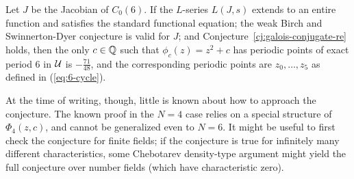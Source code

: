 \begin{corollary}
  \label{cor:6-cycle}
  Let $J$ be the Jacobian of $C_0(6)$. If the $L$-series $L(J, s)$
  extends to an entire function and satisfies the standard functional
  equation; the weak Birch and Swinnerton-Dyer conjecture is valid for
  $J$; and Conjecture~\ref{cj:galois-conjugate-re} holds, then the only
  $c \in \mathbb{Q}$ such that $\phi_c(z) = z^2 + c$ has periodic points of
  exact period 6 in $\mathcal{U}$ is $-\frac{71}{48}$, and the corresponding
  periodic points are $z_0, \dots, z_5$ as defined in
  (\ref{eq:6-cycle}).
\end{corollary}

At the time of writing, though, little is known about how to approach
the conjecture. The known proof in the $N = 4$ case relies on a
special structure of $\Phi_4(z, c)$, and cannot be generalized even to
$N = 6$. It might be useful to first check the conjecture for finite
fields; if the conjecture is true for infinitely many different
characteristics, some Chebotarev density-type argument might yield the
full conjecture over number fields (which have characteristic zero).

